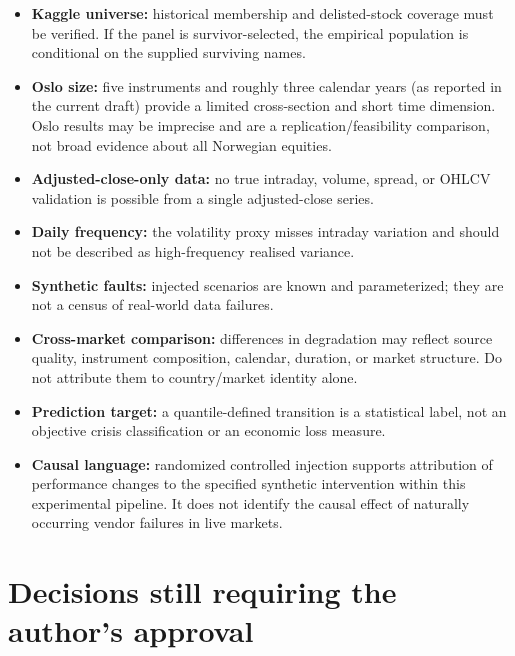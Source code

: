 \documentclass[11pt,a4paper]{article}
\begin{document}
\begin{itemize}
  \item \textbf{Kaggle universe:} historical membership and delisted-stock coverage must be verified. If the panel is survivor-selected, the empirical population is conditional on the supplied surviving names.
  \item \textbf{Oslo size:} five instruments and roughly three calendar years (as reported in the current draft) provide a limited cross-section and short time dimension. Oslo results may be imprecise and are a replication/feasibility comparison, not broad evidence about all Norwegian equities.
  \item \textbf{Adjusted-close-only data:} no true intraday, volume, spread, or OHLCV validation is possible from a single adjusted-close series.
  \item \textbf{Daily frequency:} the volatility proxy misses intraday variation and should not be described as high-frequency realised variance.
  \item \textbf{Synthetic faults:} injected scenarios are known and parameterized; they are not a census of real-world data failures.
  \item \textbf{Cross-market comparison:} differences in degradation may reflect source quality, instrument composition, calendar, duration, or market structure. Do not attribute them to country/market identity alone.
  \item \textbf{Prediction target:} a quantile-defined transition is a statistical label, not an objective crisis classification or an economic loss measure.
  \item \textbf{Causal language:} randomized controlled injection supports attribution of performance changes to the specified synthetic intervention within this experimental pipeline. It does not identify the causal effect of naturally occurring vendor failures in live markets.
\end{itemize}

\section{Decisions still requiring the author's approval}
\label{sec:open}
\end{document}
